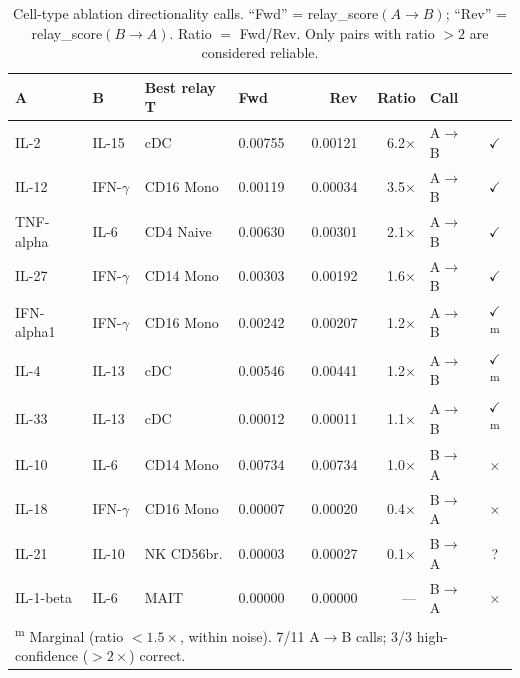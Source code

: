 \documentclass[11pt,a4paper]{article}
\begin{document}
\begin{table}[H]
\centering
\caption{%
    Cell-type ablation directionality calls. ``Fwd'' = relay\_score$(A\to B)$;
    ``Rev'' = relay\_score$(B \to A)$. Ratio $= $ Fwd/Rev.
    Only pairs with ratio $>2$ are considered reliable.
}
\begin{tabular}{llllrrl c}
\toprule
\textbf{A} & \textbf{B} & \textbf{Best relay T} & \textbf{Fwd} & \textbf{Rev} & \textbf{Ratio} & \textbf{Call} & \\
\midrule
IL-2       & IL-15        & cDC         & 0.00755 & 0.00121 & 6.2$\times$ & A$\to$B & \textcolor{correct}{$\checkmark$} \\
IL-12      & IFN-$\gamma$ & CD16 Mono   & 0.00119 & 0.00034 & 3.5$\times$ & A$\to$B & \textcolor{correct}{$\checkmark$} \\
TNF-alpha  & IL-6         & CD4 Naive   & 0.00630 & 0.00301 & 2.1$\times$ & A$\to$B & \textcolor{correct}{$\checkmark$} \\
IL-27      & IFN-$\gamma$ & CD14 Mono   & 0.00303 & 0.00192 & 1.6$\times$ & A$\to$B & \textcolor{correct}{$\checkmark$} \\
IFN-alpha1 & IFN-$\gamma$ & CD16 Mono   & 0.00242 & 0.00207 & 1.2$\times$ & A$\to$B & \textcolor{marginal}{$\checkmark$\textsuperscript{m}} \\
IL-4       & IL-13        & cDC         & 0.00546 & 0.00441 & 1.2$\times$ & A$\to$B & \textcolor{marginal}{$\checkmark$\textsuperscript{m}} \\
IL-33      & IL-13        & cDC         & 0.00012 & 0.00011 & 1.1$\times$ & A$\to$B & \textcolor{marginal}{$\checkmark$\textsuperscript{m}} \\
IL-10      & IL-6         & CD14 Mono   & 0.00734 & 0.00734 & 1.0$\times$ & B$\to$A & \textcolor{wrong}{$\times$} \\
IL-18      & IFN-$\gamma$ & CD16 Mono   & 0.00007 & 0.00020 & 0.4$\times$ & B$\to$A & \textcolor{wrong}{$\times$} \\
IL-21      & IL-10        & NK CD56br.  & 0.00003 & 0.00027 & 0.1$\times$ & B$\to$A & \textcolor{marginal}{?} \\
IL-1-beta  & IL-6         & MAIT        & 0.00000 & 0.00000 & ---         & B$\to$A & \textcolor{wrong}{$\times$} \\
\bottomrule
\multicolumn{8}{l}{\small \textsuperscript{m} Marginal (ratio $<1.5\times$, within noise). 7/11 A$\to$B calls; 3/3 high-confidence ($>2\times$) correct.}
\end{tabular}
\end{table}
\end{document}
